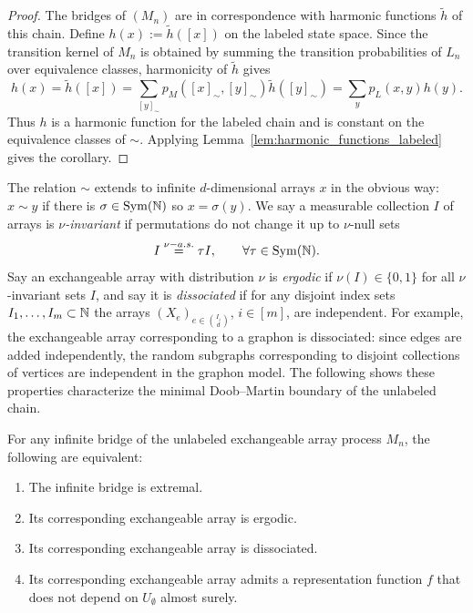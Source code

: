 \begin{proof}
The bridges of $(M_n)$ are in correspondence with harmonic functions
$\tilde{h}$ of this chain. Define $h(x) := \tilde{h}([x])$ on the labeled state
space. Since the transition kernel of $M_n$ is obtained by summing the
transition probabilities of $L_n$ over equivalence classes, harmonicity of
$\tilde{h}$ gives
%
\[
    h(x)
    =
    \tilde{h}([x])
    =
    \sum_{[y]_\sim} p_M([x]_\sim,[y]_\sim)\tilde{h}([y]_\sim)
    =
    \sum_y p_L(x,y) h(y).
\]
%
Thus $h$ is a harmonic function for the labeled chain and is constant on the
equivalence classes of $\sim$. Applying Lemma~\ref{lem:harmonic_functions_labeled}
gives the corollary.
\end{proof}

The relation $\sim$ extends to infinite $d$-dimensional arrays $x$
in the obvious way: $x \sim y$ if there is $\sigma \in \operatorname{Sym}(\mathbb{N})$ so $x = \sigma(y)$.
 We say a measurable collection $I$ of arrays is \textit{$\nu$-invariant} if
 permutations do not change it up to $\nu$-null sets
    \[ I \overset{\nu-a.s.}{=} \tau I, \quad  \quad \forall \tau \in \operatorname{Sym}(\mathbb{N}).\]
%
Say an exchangeable array with distribution $\nu$ is \textit{ergodic} if $\nu(I) \in \{0,1\}$
for all $\nu$-invariant sets $I$, and say it is \textit{dissociated} if for any disjoint index
sets $I_1,\ldots,I_m \subset \mathbb{N}$ the arrays $(X_e)_{e \in \binom{I_i}{d}}$, $i\in[m]$, are independent.
For example, the exchangeable array corresponding to a graphon is dissociated: since edges are added independently,
the random subgraphs corresponding to disjoint collections of vertices are independent in the graphon model.
The following shows these properties characterize the minimal Doob--Martin boundary of
the unlabeled chain.

\begin{theorem}
\label{thm:boundary_is_ergodic_arrays}
    For any infinite bridge of the unlabeled exchangeable array process $M_n$, the following are equivalent:

    \begin{enumerate}
        \item The infinite bridge is extremal.
        \item Its corresponding exchangeable array is ergodic.
        \item Its corresponding exchangeable array is dissociated.
        \item Its corresponding exchangeable array admits a representation function $f$ that does not depend on $U_\emptyset$ almost surely.
    \end{enumerate}
\end{theorem}

